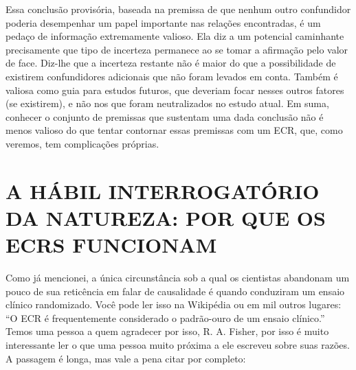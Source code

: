 \documentclass[11pt,a5paper,twoside]{book}
\begin{document}
Essa conclusão provisória, baseada na premissa de que nenhum outro confundidor poderia desempenhar um papel importante nas relações encontradas, é um pedaço de informação extremamente valioso. Ela diz a um potencial caminhante precisamente que tipo de incerteza permanece ao se tomar a afirmação pelo valor de face. Diz-lhe que a incerteza restante não é maior do que a possibilidade de existirem confundidores adicionais que não foram levados em conta. Também é valiosa como guia para estudos futuros, que deveriam focar nesses outros fatores (se existirem), e não nos que foram neutralizados no estudo atual. Em suma, conhecer o conjunto de premissas que sustentam uma dada conclusão não é menos valioso do que tentar contornar essas premissas com um ECR, que, como veremos, tem complicações próprias.

\section{A HÁBIL INTERROGATÓRIO DA NATUREZA: POR QUE OS ECRS FUNCIONAM}
Como já mencionei, a única circunstância sob a qual os cientistas abandonam um pouco de sua reticência em falar de causalidade é quando conduziram um ensaio clínico randomizado. Você pode ler isso na Wikipédia ou em mil outros lugares: “O ECR é frequentemente considerado o padrão-ouro de um ensaio clínico.” Temos uma pessoa a quem agradecer por isso, R. A. Fisher, por isso é muito interessante ler o que uma pessoa muito próxima a ele escreveu sobre suas razões. A passagem é longa, mas vale a pena citar por completo:
\end{document}
